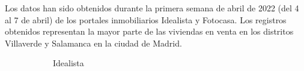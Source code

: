 \documentclass[12pt]{article}
\begin{document}

Los datos han sido obtenidos durante la primera semana de abril de 2022 (del 4 al 7 de abril) de los portales inmobiliarios Idealista y Fotocasa. Los registros obtenidos representan la mayor parte de las viviendas en venta en los distritos Villaverde y Salamanca en la ciudad de Madrid.

\begin{figure}[h]
	\centering
	\caption{Distritos de Villaverde y Salamanca \textit{scrapeados}}
	\begin{subfigure}{0.5\textwidth}
		\centering
		\caption{\vspace{1.5em}Idealista}
	\end{subfigure}%
	\begin{subfigure}{0.5\textwidth}
		\centering

\end{subfigure}
\end{figure}
\end{document}
